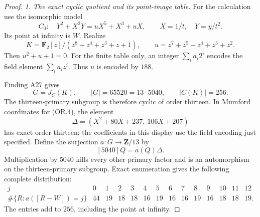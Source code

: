 \begin{proof}
\emph{1. The exact cyclic quotient and its point-image table.}
For the calculation use the isomorphic model
\[
 C_0:\quad Y^2+X^2Y=uX^5+X^3+uX,
 \qquad X=1/t,\quad Y=y/t^2.
 \tag{OR.4}
\]
Its point at infinity is $W$.  Realize
\[
 K=\mathbf F_2[z]/(z^8+z^4+z^3+z+1),\qquad
 u=z^7+z^5+z^4+z^3+z^2.
 \tag{OR.5}
\]
Then $u^2+u+1=0$.  For the finite table only, an integer
$\sum_i a_i2^i$ encodes the field element $\sum_i a_iz^i$.
Thus $u$ is encoded by $188$.

Finding A27 gives
\[
        G=J_C(K),\qquad |G|=65520=13\cdot5040,
        \qquad |C(K)|=256.
 \tag{OR.6}
\]
The thirteen-primary subgroup is therefore cyclic of order
thirteen.  In Mumford coordinates for (OR.4), the element
\[
        \Delta=(X^2+80X+237,\ 106X+207)
 \tag{OR.7}
\]
has exact order thirteen; the coefficients in this display use
the field encoding just specified.  Define the surjection
$a:G\to\mathbf Z/13$ by
\[
                      [5040]Q=a(Q)\Delta.
 \tag{OR.8}
\]
Multiplication by $5040$ kills every other primary factor and
is an automorphism on the thirteen-primary subgroup.  Exact
enumeration gives the following complete distribution:
\[
\begin{array}{c|rrrrrrrrrrrrr}
 j&0&1&2&3&4&5&6&7&8&9&10&11&12\\ \hline
 \#\{R:a([R-W])=j\}
 &44&19&18&18&16&19&16&16&19&16&18&18&19.
\end{array}
 \tag{OR.9}
\]
The entries add to $256$, including the point at infinity.


\end{proof}

